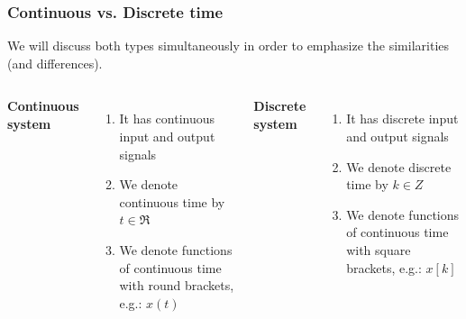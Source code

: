 \documentclass{beamer}
\begin{document}
\begin{frame}
\frametitle{Continuous vs. Discrete time}
We will discuss both types simultaneously in order to emphasize the similarities (and differences).\\
\medskip
\begin{columns}[c] 

\center \textbf{Continuous system}
\begin{enumerate}
\item It has continuous input and output signals
\item We denote continuous time by $t \in \Re$
\item We denote functions of continuous time with round brackets, e.g.: $x(t)$
\end{enumerate}

\center \textbf{Discrete system}
\begin{enumerate}
\item It has discrete input and output signals
\item We denote discrete time by $k \in Z$
\item We denote functions of continuous time with square brackets, e.g.: $x[k]$
\end{enumerate}

\end{columns}
\end{frame}

\end{document}
